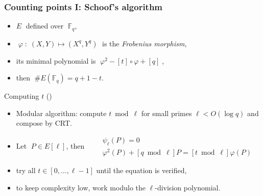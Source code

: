 \documentclass[10pt]{beamer}
\newcommand{\card}[1]{\# #1}  %
\newcommand{\F}{\mathbb{F}}  %
\newcommand{\frob}{\varphi}  %
\newcommand{\0}{\mathcal{O}}  %
\begin{document}
\begin{frame}
  \frametitle{Counting points I: Schoof's algorithm}
  
  \begin{theorem}[Hasse]
    \begin{itemize}
    \item $E\;$ defined over $\;\F_q$,
    \item$\;\frob \;:\; (X,Y) \mapsto (X^q,Y^q)\;$ is the
      \emph{Frobenius morphism},
    \item its minimal polynomial is $\;\frob^2-[t]\circ\frob + [q]\;$,
    \item then $\;\card{E(\F_q)} = q + 1 - t$.
    \end{itemize}
  \end{theorem}

  \begin{block}{Computing $t$ (\cite{Scho95})}
    \begin{itemize}
    \item Modular algorithm: compute $t \bmod \ell$ for small primes
      $\ell < O(\log q)$ and compose by CRT.
    \item Let $\;P\in E[\ell]$, then
      $\quad\begin{aligned}
        &\psi_\ell(P) = 0\\
        &\frob^2(P) + [q\bmod\ell]P = [t \bmod \ell]\frob(P)
      \end{aligned}$
    \item try all $t\in[0,\ldots,\ell-1]$ until the equation is verified,
    \item to keep complexity low, work modulo the $\ell$-division
      polynomial.
    \end{itemize}
  \end{block}

\end{frame}

\end{document}
